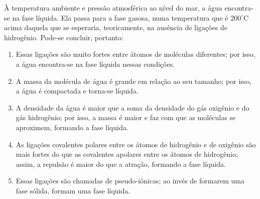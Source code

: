 À temperatura ambiente e pressão atmosférica ao nível do mar, a água encontra-se na fase líquida.
Ela passa para a fase gasosa, numa temperatura que é $200 ^\circ$C acima daquela que se esperaria, teoricamente, na ausência de ligações de hidrogênio.
Pode-se concluir, portanto:


\begin{enumerate}[label = (\alph*)]
	\item Essas ligações são muito fortes entre átomos de moléculas diferentes; por isso, a água encontra-se na fase líquida nessas condições.
	\item A massa da molécula de água é grande em relação ao seu tamanho; por isso, a água é compactada e torna-se líquida.
	\item A densidade da água é maior que a soma da densidade do gás oxigênio e do gás hidrogênio; por isso, a massa é maior e faz com que as moléculas se aproximem, formando a fase líquida. 
	\item As ligações covalentes polares entre os átomos de hidrogênio e de oxigênio são mais fortes do que as covalentes apolares entre os átomos de hidrogênio; assim, a repulsão é maior do que a atração, formando a fase líquida.
	\item Essas ligações são chamadas de pseudo-iônicas; ao invés de formarem uma fase
sólida, formam uma fase líquida.
\end{enumerate}

